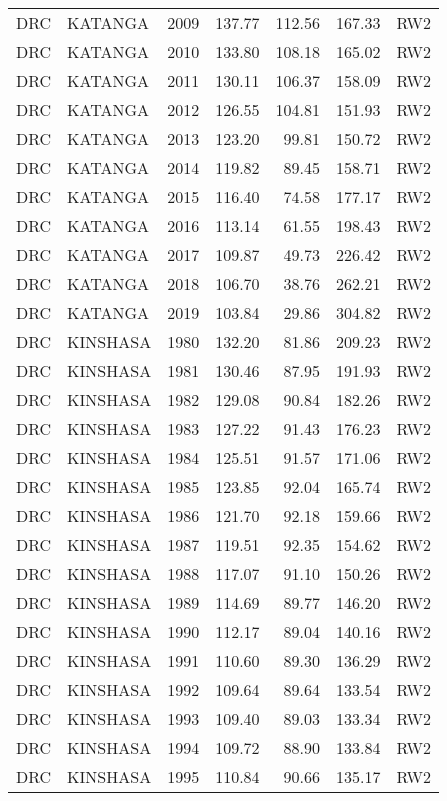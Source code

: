 \begin{longtable}{lllrrrl}
  DRC & KATANGA & 2009 & 137.77 & 112.56 & 167.33 & RW2 \\ 
  DRC & KATANGA & 2010 & 133.80 & 108.18 & 165.02 & RW2 \\ 
  DRC & KATANGA & 2011 & 130.11 & 106.37 & 158.09 & RW2 \\ 
  DRC & KATANGA & 2012 & 126.55 & 104.81 & 151.93 & RW2 \\ 
  DRC & KATANGA & 2013 & 123.20 & 99.81 & 150.72 & RW2 \\ 
  DRC & KATANGA & 2014 & 119.82 & 89.45 & 158.71 & RW2 \\ 
  DRC & KATANGA & 2015 & 116.40 & 74.58 & 177.17 & RW2 \\ 
  DRC & KATANGA & 2016 & 113.14 & 61.55 & 198.43 & RW2 \\ 
  DRC & KATANGA & 2017 & 109.87 & 49.73 & 226.42 & RW2 \\ 
  DRC & KATANGA & 2018 & 106.70 & 38.76 & 262.21 & RW2 \\ 
  DRC & KATANGA & 2019 & 103.84 & 29.86 & 304.82 & RW2 \\ 
  DRC & KINSHASA & 1980 & 132.20 & 81.86 & 209.23 & RW2 \\ 
  DRC & KINSHASA & 1981 & 130.46 & 87.95 & 191.93 & RW2 \\ 
  DRC & KINSHASA & 1982 & 129.08 & 90.84 & 182.26 & RW2 \\ 
  DRC & KINSHASA & 1983 & 127.22 & 91.43 & 176.23 & RW2 \\ 
  DRC & KINSHASA & 1984 & 125.51 & 91.57 & 171.06 & RW2 \\ 
  DRC & KINSHASA & 1985 & 123.85 & 92.04 & 165.74 & RW2 \\ 
  DRC & KINSHASA & 1986 & 121.70 & 92.18 & 159.66 & RW2 \\ 
  DRC & KINSHASA & 1987 & 119.51 & 92.35 & 154.62 & RW2 \\ 
  DRC & KINSHASA & 1988 & 117.07 & 91.10 & 150.26 & RW2 \\ 
  DRC & KINSHASA & 1989 & 114.69 & 89.77 & 146.20 & RW2 \\ 
  DRC & KINSHASA & 1990 & 112.17 & 89.04 & 140.16 & RW2 \\ 
  DRC & KINSHASA & 1991 & 110.60 & 89.30 & 136.29 & RW2 \\ 
  DRC & KINSHASA & 1992 & 109.64 & 89.64 & 133.54 & RW2 \\ 
  DRC & KINSHASA & 1993 & 109.40 & 89.03 & 133.34 & RW2 \\ 
  DRC & KINSHASA & 1994 & 109.72 & 88.90 & 133.84 & RW2 \\ 
  DRC & KINSHASA & 1995 & 110.84 & 90.66 & 135.17 & RW2 \\ 

\end{longtable}

